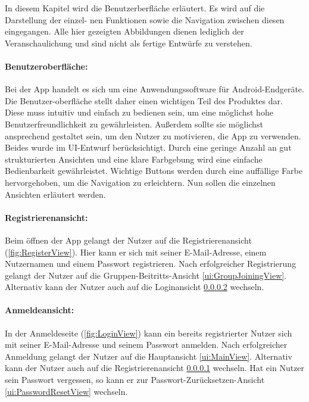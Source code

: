 \documentclass[parskip=full]{scrartcl}
\begin{document}
In diesem Kapitel wird die Benutzerberfläche erläutert. Es wird auf die Darstellung der einzel- nen Funktionen sowie die Navigation zwischen diesen eingegangen. Alle hier gezeigten Abbildungen dienen lediglich der Veranschaulichung und sind nicht als fertige Entwürfe zu verstehen.

\paragraph*{Benutzeroberfläche:}
Bei der App handelt es sich um eine Anwendungssoftware für Android-Endgeräte. Die Benutzer-oberfläche stellt daher einen wichtigen Teil des Produktes dar. Diese muss intuitiv und einfach zu bedienen sein, um eine möglichst hohe Benutzerfreundlichkeit zu gewährleisten. Außerdem sollte sie möglichst ansprechend gestaltet sein, um den Nutzer zu motivieren, die App zu verwenden. Beides wurde im UI-Entwurf berücksichtigt. Durch eine geringe Anzahl an gut strukturierten Ansichten und eine klare Farbgebung wird eine einfache Bedienbarkeit gewährleistet. Wichtige Buttons werden durch eine auffällige Farbe hervorgehoben, um die Navigation zu erleichtern. Nun sollen die einzelnen Ansichten erläutert werden.

\paragraph{Registrierenansicht:}
\label{ui:RegisterView}
Beim öffnen der App gelangt der Nutzer auf die Registrierenansicht (\autoref{fig:RegisterView}). Hier kann er sich mit seiner E-Mail-Adresse, einem Nutzernamen und einem Passwort registrieren. Nach erfolgreicher Registrierung gelangt der Nutzer auf die Gruppen-Beitritts-Ansicht \ref{ui:GroupJoiningView}. Alternativ kann der Nutzer auch auf die Loginansicht \ref{ui:LoginView} wechseln.

\paragraph{Anmeldeansicht:}
\label{ui:LoginView}
In der Anmeldeseite (\autoref{fig:LoginView}) kann ein bereits registrierter Nutzer sich mit seiner E-Mail-Adresse und seinem Passwort anmelden. Nach erfolgreicher Anmeldung gelangt der Nutzer auf die Hauptansicht \ref{ui:MainView}. Alternativ kann der Nutzer auch auf die Registrierenansicht \ref{ui:RegisterView} wechseln.
Hat ein Nutzer sein Passwort vergessen, so kann er zur Passwort-Zurücksetzen-Ansicht \ref{ui:PasswordResetView} wechseln.
\end{document}
